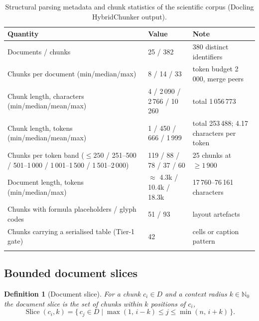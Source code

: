 \documentclass[pdflatex,sn-mathphys-num]{sn-jnl}
\newcommand{\Slice}{\operatorname{Slice}}
\theoremstyle{thmstyleone}%
\theoremstyle{thmstylethree}%
\newtheorem{definition}{Definition}%
\begin{document}
\begin{table}[htbp]
\caption{Structural parsing metadata and chunk statistics of the scientific corpus (Docling HybridChunker output).}\label{tab:parsing}
\begin{tabular}{@{}p{5.4cm}p{4.0cm}p{2.8cm}@{}}
\toprule
Quantity & Value & Note \\
\midrule
Documents / chunks & 25 / 382 & 380 distinct identifiers\footnotemark[1] \\
Chunks per document (min/median/max) & 8 / 14 / 33 & token budget 2\,000, merge peers \\
Chunk length, characters (min/median/mean/max) & 4 / 2\,090 / 2\,766 / 10\,260 & total 1\,056\,773 \\
Chunk length, tokens (min/median/mean/max) & 1 / 450 / 666 / 1\,999 & total 253\,488; 4.17 characters per token \\
Chunks per token band ($\le 250$ / 251--500 / 501--1\,000 / 1\,001--1\,500 / 1\,501--2\,000) & 119 / 88 / 78 / 37 / 60 & 25 chunks at $\ge 1\,900$ \\
Document length, tokens (min/median/max) & $\approx$ 4.3k / 10.4k / 18.3k & 17\,760--76\,161 characters \\
Chunks with formula placeholders / glyph codes & 51 / 93 & layout artefacts \\
Chunks carrying a serialised table (Tier-1 gate) & 42 & cells or caption pattern \\
\botrule
\end{tabular}
\end{table}

\subsection{Bounded document slices}\label{sec:slice}

\begin{definition}[Document slice]\label{def:slice}
For a chunk $c_i\in D$ and a context radius $k\in\mathbb{N}_0$ the document slice is the set of chunks within $k$ positions of $c_i$,
\begin{equation}\label{eq:slice}
\Slice(c_i,k)=\{\,c_j\in D \mid \max(1,\,i-k)\le j\le \min(n,\,i+k)\,\}.
\end{equation}
\end{definition}
\end{document}
